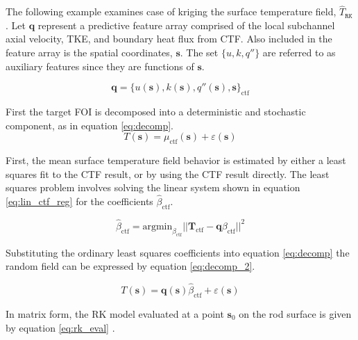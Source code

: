 The following example examines case of kriging the surface temperature field, $\hat T_\mathtt{RK}$.
Let $\mathbf{q}$ represent a predictive feature array comprised of the local subchannel axial velocity,
TKE, and boundary heat flux from CTF.  Also included in the feature array is the spatial coordinates, $\mathbf s$.  The set $\{u, k, q'' \}$ are referred to as auxiliary features since they are functions of $\mathbf s$.

\begin{equation}
\mathbf{q} = \{u(\mathbf s), k(\mathbf s), q''(\mathbf s), \mathbf s \}_{\mathrm{ctf}}
\end{equation}

First the target FOI is decomposed into a deterministic and stochastic component, as in equation \ref{eq:decomp}.
\begin{equation}
T(\mathbf s) = \mu_{\mathrm{ctf}}(\mathbf s) + \varepsilon(\mathbf s)
\label{eq:decomp}
\end{equation}

First, the mean surface temperature field behavior is estimated by either a least squares fit to the CTF result, or by using the CTF result directly.  The least squares problem involves solving the linear system shown in equation \ref{eq:lin_ctf_reg} for the coefficients $\hat{\beta}_{\mathrm{ctf}}$.

\begin{equation}
\hat \beta_{\mathrm{ctf}} = \mathrm{argmin}_{\beta_{\mathrm{ctf}}} ||\mathbf T_{\mathrm{ctf}} - \mathbf q \beta_{\mathrm{ctf}}||^2
\label{eq:lin_ctf_reg}
\end{equation}

Substituting the ordinary least squares coefficients into equation \ref{eq:decomp} the random field can be expressed by equation \ref{eq:decomp_2}.

\begin{equation}
T(\mathbf s) = \mathbf q(\mathbf s) \hat \beta_{\mathrm{ctf}} + \varepsilon(\mathbf s)
\label{eq:decomp_2}
\end{equation}

In matrix form, the RK model evaluated at a point $\mathbf{s}_0 $ on the rod surface is given by equation \ref{eq:rk_eval} \cite{Hengl07}.

